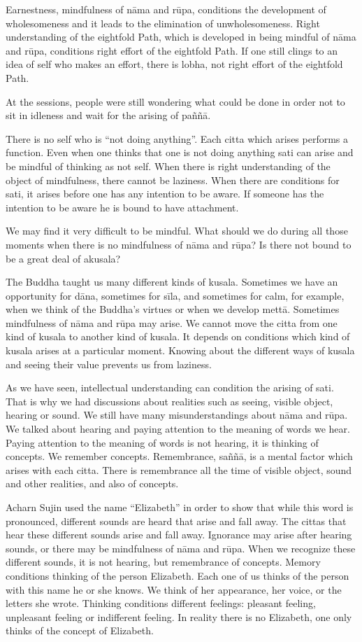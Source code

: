 Earnestness, mindfulness of nāma and rūpa, conditions the development of
wholesomeness and it leads to the elimination of unwholesomeness. Right
understanding of the eightfold Path, which is developed in being mindful
of nāma and rūpa, conditions right effort of the eightfold Path. If one
still clings to an idea of self who makes an effort, there is lobha, not
right effort of the eightfold Path.

At the sessions, people were still wondering what could be done in order
not to sit in idleness and wait for the arising of paññā.

There is no self who is ``not doing anything''. Each citta which arises
performs a function. Even when one thinks that one is not doing anything
sati can arise and be mindful of thinking as not self. When there is
right understanding of the object of mindfulness, there cannot be
laziness. When there are conditions for sati, it arises before one has
any intention to be aware. If someone has the intention to be aware he
is bound to have attachment.

We may find it very difficult to be mindful. What should we do during
all those moments when there is no mindfulness of nāma and rūpa? Is
there not bound to be a great deal of akusala?

The Buddha taught us many different kinds of kusala. Sometimes we have
an opportunity for dāna, sometimes for sīla, and sometimes for calm, for
example, when we think of the Buddha's virtues or when we develop mettā.
Sometimes mindfulness of nāma and rūpa may arise. We cannot move the
citta from one kind of kusala to another kind of kusala. It depends on
conditions which kind of kusala arises at a particular moment. Knowing
about the different ways of kusala and seeing their value prevents us
from laziness.

As we have seen, intellectual understanding can condition the arising of
sati. That is why we had discussions about realities such as seeing,
visible object, hearing or sound. We still have many misunderstandings
about nāma and rūpa. We talked about hearing and paying attention to the
meaning of words we hear. Paying attention to the meaning of words is
not hearing, it is thinking of concepts. We remember concepts.
Remembrance, saññā, is a mental factor which arises with each citta.
There is remembrance all the time of visible object, sound and other
realities, and also of concepts.

Acharn Sujin used the name ``Elizabeth'' in order to show that while
this word is pronounced, different sounds are heard that arise and fall
away. The cittas that hear these different sounds arise and fall away.
Ignorance may arise after hearing sounds, or there may be mindfulness of
nāma and rūpa. When we recognize these different sounds, it is not
hearing, but remembrance of concepts. Memory conditions thinking of the
person Elizabeth. Each one of us thinks of the person with this name he
or she knows. We think of her appearance, her voice, or the letters she
wrote. Thinking conditions different feelings: pleasant feeling,
unpleasant feeling or indifferent feeling. In reality there is no
Elizabeth, one only thinks of the concept of Elizabeth.

